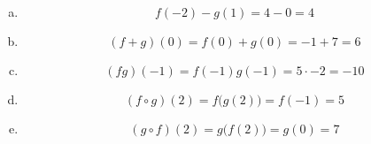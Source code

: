 \documentclass[11pt,letterpaper]{article}
\begin{document}
\sol 
\begin{enumerate}[(a)]
\item 
	\[
	f(-2) - g(1)= 4 - 0= 4
	\] \pspace

\item 
	\[
	(f + g)(0)= f(0) + g(0)= -1 + 7= 6
	\] \pspace
 
\item 
	\[
	(fg)(-1)= f(-1) g(-1)= 5 \cdot -2= -10
	\] \pspace
 
\item 
	\[
	(f \circ g)(2)= f \big( g(2) \big)= f(-1)= 5 
	\] \pspace
 
\item 
	\[
	(g \circ f)(2)= g \big( f(2) \big)= g(0)= 7
	\] 
\end{enumerate}
\end{document}
